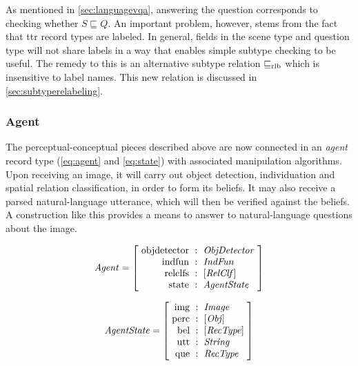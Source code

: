 As mentioned in \autoref{sec:languagevqa}, answering the question corresponds to checking whether $S \sqsubseteq Q$.
An important problem, however, stems from the fact that \gls{ttr} record types are labeled.
In general, fields in the scene type and question type will not share labels in a way that enables simple subtype checking to be useful.
The remedy to this is an alternative subtype relation $\mathrel{\sqsubseteq_\text{rlb}}$ which is insensitive to label names.
This new relation is discussed in \autoref{sec:subtyperelabeling}.



\subsubsection{Agent}
\label{sec:agent}

The perceptual-conceptual pieces described above are now connected in an \textit{agent} record type (\autoref{eq:agent} and \autoref{eq:state}) with associated manipulation algorithms.
Upon receiving an image, it will carry out object detection, individuation and spatial relation classification, in order to form its beliefs.
It may also receive a parsed natural-language utterance, which will then be verified against the beliefs.
A construction like this provides a means to answer to natural-language questions about the image.

\begin{equation}\label{eq:agent}
\type{Agent} = \rec{
    \text{objdetector} &:& \type{ObjDetector} \\
    \text{indfun} &:& \type{IndFun} \\
    \text{relclfs} &:& [\type{RelClf}] \\
    \text{state} &:& \type{AgentState} \\
    }
\end{equation}

\begin{equation}\label{eq:state}
\type{AgentState} = \rec{
    \text{img} &:& \type{Image} \\
    \text{perc} &:& [\type{Obj}] \\
    \text{bel} &:& [\type{RecType}] \\
    \text{utt} &:& \type{String} \\
    \text{que} &:& \type{RecType} \\
    }
\end{equation}

